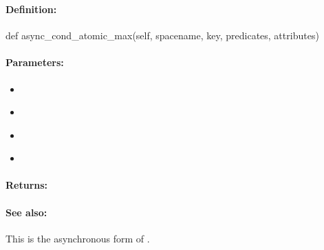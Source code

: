 \pagebreak
\subsubsection{}
\label{api:python:async_cond_atomic_max}


\paragraph{Definition:}
\begin{pythoncode}
def async_cond_atomic_max(self, spacename, key, predicates, attributes)
\end{pythoncode}

\paragraph{Parameters:}
\begin{itemize}[noitemsep]
\item {}\\

\item {}\\

\item {}\\

\item {}\\

\end{itemize}

\paragraph{Returns:}


\paragraph{See also:}  This is the asynchronous form of .

\pagebreak
\subsubsection{}
\label{api:python:string_prepend}



